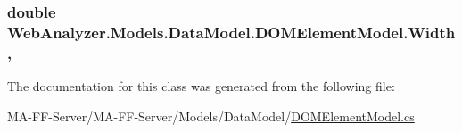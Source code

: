 \subsubsection[{Width}]{\setlength{\rightskip}{0pt plus 5cm}double Web\+Analyzer.\+Models.\+Data\+Model.\+D\+O\+M\+Element\+Model.\+Width\hspace{0.3cm}{\ttfamily [get]}, {\ttfamily [set]}}\label{class_web_analyzer_1_1_models_1_1_data_model_1_1_d_o_m_element_model_a34aa9812237c151017294753a8ee77a7}


The documentation for this class was generated from the following file\+:\begin{DoxyCompactItemize}
\item 
M\+A-\/\+F\+F-\/\+Server/\+M\+A-\/\+F\+F-\/\+Server/\+Models/\+Data\+Model/\hyperlink{_d_o_m_element_model_8cs}{D\+O\+M\+Element\+Model.\+cs}\end{DoxyCompactItemize}
